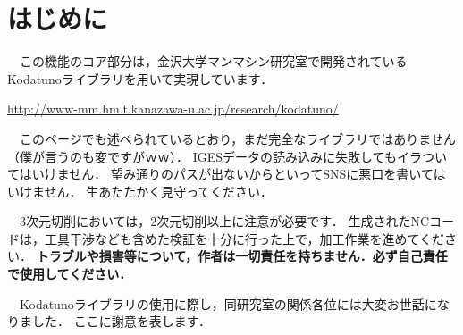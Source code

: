 \section*{はじめに}
　この機能のコア部分は，金沢大学マンマシン研究室で開発されているKodatunoライブラリを用いて実現しています．
\begin{center}
\url{http://www-mm.hm.t.kanazawa-u.ac.jp/research/kodatuno/}
\end{center}
　このページでも述べられているとおり，まだ完全なライブラリではありません（僕が言うのも変ですがｗｗ）．
IGESデータの読み込みに失敗してもイラついてはいけません．
望み通りのパスが出ないからといってSNSに悪口を書いてはいけません．
生あたたかく見守ってください．

　3次元切削においては，2次元切削以上に注意が必要です．
生成されたNCコードは，工具干渉なども含めた検証を十分に行った上で，加工作業を進めてください．
\textbf{トラブルや損害等について，作者は一切責任を持ちません．必ず自己責任で使用してください．}

\vspace*{2zh}
　Kodatunoライブラリの使用に際し，同研究室の関係各位には大変お世話になりました．
ここに謝意を表します．
